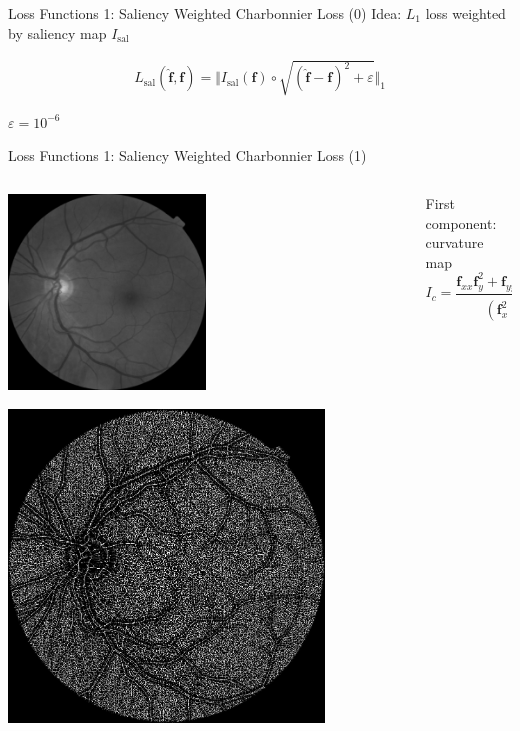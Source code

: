 \documentclass{beamer}
\newcommand{\img}{\bm{f}} %
\begin{document}
\begin{frame}{Loss Functions 1: Saliency Weighted Charbonnier Loss (0)}
  Idea: $L_1$ loss weighted by saliency map $I_{\text{sal}}$

\begin{align}
\label{eq:charbonnier}
  L_{\text{sal}}( \hat{\bm{\img}}, \bm{\img}) = \Vert I_{\text{sal}}(\img) \circ \sqrt{ (\hat{\img} - \img)^2 + \varepsilon} \Vert_1
\end{align}

$\varepsilon = 10^{-6}$

\end{frame}

\begin{frame}{Loss Functions 1: Saliency Weighted Charbonnier Loss (1)}
\begin{columns}
  \begin{column}{0.5\linewidth}
      \centering
      \includegraphics[width=0.5\textwidth]{saliency_gt}

      \includegraphics[width=0.8\textwidth]{saliency_vessels}
  \end{column}
  \begin{column}{0.6\linewidth}
  First component: curvature map
\begin{equation}
 I_c = \frac{\img_{xx} \img_y^2 + \img_{yy} \img_x^2 - 2 \img_{x} \img_{xy} \img_{y} }{(\img_x^2 + \img_y^2)^{1.5}}
\end{equation}
\end{column} 
\end{columns}

\end{frame}
\end{document}
